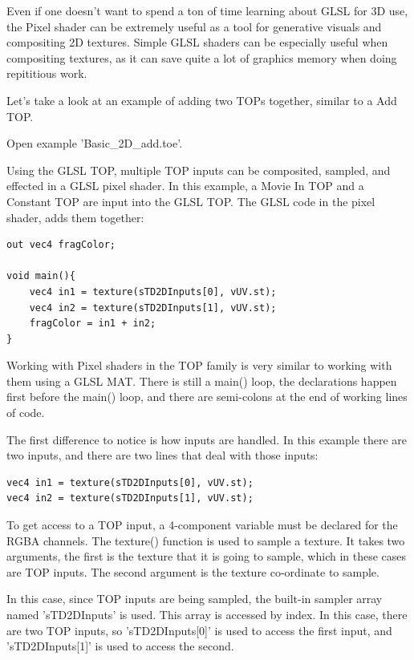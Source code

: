 \begin{fullwidth}
Even if one doesn't want to spend a ton of time learning about GLSL for 3D use, the Pixel shader can be extremely useful as a tool for generative visuals and compositing 2D textures. Simple GLSL shaders can be especially useful when compositing textures, as it can save quite a lot of graphics memory when doing repititious work.

Let's take a look at an example of adding two TOPs together, similar to a Add TOP.

Open example 'Basic\_2D\_add.toe'.

Using the GLSL TOP, multiple TOP inputs can be composited, sampled, and effected in a GLSL pixel shader. In this example, a Movie In TOP and a Constant TOP are input into the GLSL TOP. The GLSL code in the pixel shader, adds them together:

\begin{lstlisting}
out vec4 fragColor;

void main(){
	vec4 in1 = texture(sTD2DInputs[0], vUV.st);
	vec4 in2 = texture(sTD2DInputs[1], vUV.st);
	fragColor = in1 + in2;
}
\end{lstlisting}

Working with Pixel shaders in the TOP family is very similar to working with them using a GLSL MAT. There is still a main() loop, the declarations happen first before the main() loop, and there are semi-colons at the end of working lines of code.

The first difference to notice is how inputs are handled. In this example there are two inputs, and there are two lines that deal with those inputs:

\begin{lstlisting}
vec4 in1 = texture(sTD2DInputs[0], vUV.st);
vec4 in2 = texture(sTD2DInputs[1], vUV.st);
\end{lstlisting}

To get access to a TOP input, a 4-component variable must be declared for the RGBA channels. The texture() function is used to sample a texture. It takes two arguments, the first is the texture that it is going to sample, which in these cases are TOP inputs. The second argument is the texture co-ordinate to sample.

In this case, since TOP inputs are being sampled, the built-in sampler array named 'sTD2DInputs' is used. This array is accessed by index. In this case, there are two TOP inputs, so 'sTD2DInputs[0]' is used to access the first input, and 'sTD2DInputs[1]' is used to access the second.


\end{fullwidth}
